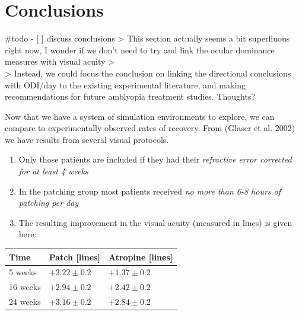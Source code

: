 \documentclass[
  letterpaper,
  DIV=11,
  numbers=noendperiod]{scrreprt}
\providecommand{\tightlist}{%
  \setlength{\itemsep}{0pt}\setlength{\parskip}{0pt}}\usepackage{longtable,booktabs,array}
\begin{document}
\hypertarget{section-1}{%
\chapter{}\label{section-1}}

\part{Conclusions}

\#todo - {[} {]} discuss conclusions \textgreater{} This section
actually seems a bit superfluous right now, I wonder if we don't need to
try and link the ocular dominance measures with visual acuity
\textgreater{}\\
\textgreater{} Instead, we could focus the conclusion on linking the
directional conclusions with ODI/day to the existing experimental
literature, and making recommendations for future amblyopia treatment
studies. Thoughts?

Now that we have a system of simulation environments to explore, we can
compare to experimentally observed rates of recovery. From (Glaser et
al. 2002) we have results from several visual protocols.

\begin{enumerate}
\def\labelenumi{\arabic{enumi}.}
\tightlist
\item
  Only those patients are included if they had their \emph{refractive
  error corrected for at least 4 weeks}
\item
  In the patching group most patients received \emph{no more than 6-8
  hours of patching per day}
\item
  The resulting improvement in the visual acuity (measured in lines) is
  given here:
\end{enumerate}

\begin{longtable}[]{@{}lll@{}}
\toprule()
Time & Patch {[}lines{]} & Atropine {[}lines{]} \\
\midrule()
\endhead
5 weeks & \(+2.22 \pm 0.2\) & \(+1.37 \pm 0.2\) \\
16 weeks & \(+2.94 \pm 0.2\) & \(+2.42 \pm 0.2\) \\
24 weeks & \(+3.16 \pm 0.2\) & \(+2.84 \pm 0.2\) \\
\bottomrule()
\end{longtable}
\end{document}
